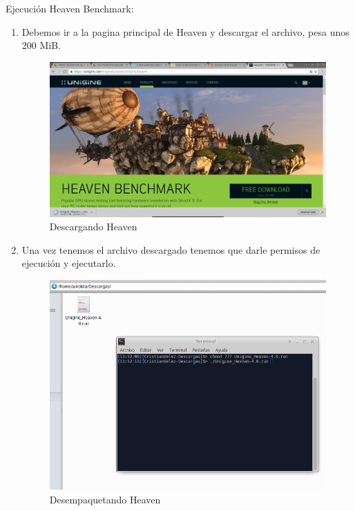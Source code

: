 Ejecución Heaven Benchmark:

\begin{enumerate}
	\item Debemos ir a la pagina principal de Heaven y descargar el archivo, pesa unos 200 MiB.
	
	\begin{figure}[H] %
		\centering
		\includegraphics[scale=0.3]{pics/heaven}  %
		\caption{Descargando Heaven} \label{fig:figuraDescarga}
	\end{figure}

	\item Una vez tenemos el archivo descargado tenemos que darle permisos de ejecución y ejecutarlo.
	
	\begin{figure}[H] %
		\centering
		\includegraphics[scale=0.3]{pics/heaven1}  %
		\caption{Desempaquetando Heaven} \label{fig:HEAVEN1}
	\end{figure}


\end{enumerate}
